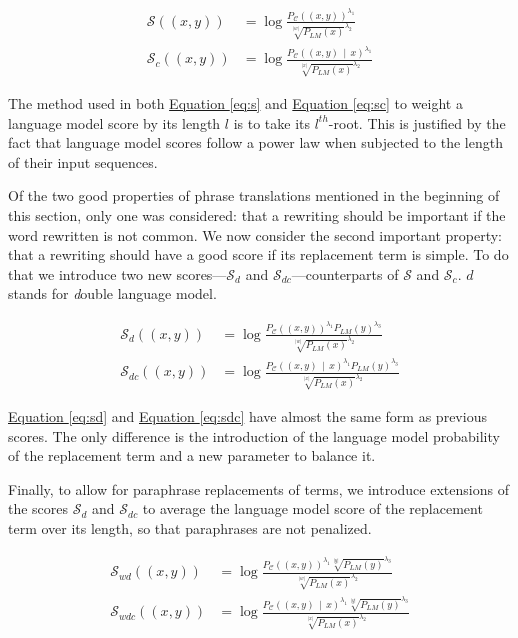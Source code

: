 \documentclass[a4paper, 11pt, onepage]{scrreprt}
\newcommand\equaref[1]{\hyperref[#1]{Equation \ref*{#1}}}
\newcommand\card[1]{\lvert #1 \rvert}
\newcommand\given{\, \middle| \,}
\newcommand\proba[2][]{P_{#1} \left( #2 \right)}
\begin{document}
\begin{align}
  \label{eq:s}
  \mathcal{S}((x, y)) & = \log \frac%
  {\proba[\mathcal{C}]{(x, y)}^{\lambda_1}}%
  {\sqrt[\card{w}]{\proba[LM]{x}}^{\lambda_2}} \\
  \label{eq:sc}
  \mathcal{S}_{c}((x, y)) & = \log \frac%
  {\proba[\mathcal{C}]{(x, y) \given x}^{\lambda_1}}%
  {\sqrt[\card{x}]{\proba[LM]{x}}^{\lambda_2}}
\end{align}

The method used in both \equaref{eq:s} and \equaref{eq:sc} to
weight a language model score by its length $l$ is to take its
$l^{th}$-root. This is justified by the fact that language model
scores follow a power law when subjected to the length of their input
sequences.

Of the two good properties of phrase translations mentioned in the
beginning of this section, only one was considered: that a rewriting
should be important if the word rewritten is not common. We now
consider the second important property: that a rewriting should have a
good score if its replacement term is simple. To do that we introduce
two new scores—$\mathcal{S}_d$ and $\mathcal{S}_{dc}$—counterparts of
$\mathcal{S}$ and $\mathcal{S}_c$. $d$ stands for \emph{d}ouble
language model.

\begin{align}
  \label{eq:sd}
  \mathcal{S}_d((x, y)) & = \log \frac%
  {\proba[\mathcal{C}]{(x, y)}^{\lambda_1}\proba[LM]{y}^{\lambda_3}}%
  {\sqrt[\card{w}]{\proba[LM]{x}}^{\lambda_2}} \\
  \label{eq:sdc}
  \mathcal{S}_{dc}((x, y)) & = \log \frac%
  {\proba[\mathcal{C}]{(x, y) \given x}^{\lambda_1}\proba[LM]{y}^{\lambda_3}}%
  {\sqrt[\card{x}]{\proba[LM]{x}}^{\lambda_2}}
\end{align}

\equaref{eq:sd} and \equaref{eq:sdc} have almost the same form as
previous scores. The only difference is the introduction of the
language model probability of the replacement term and a new parameter
to balance it.

Finally, to allow for paraphrase replacements of terms, we introduce
extensions of the scores $\mathcal{S}_d$ and $\mathcal{S}_{dc}$ to
average the language model score of the replacement term over its
length, so that paraphrases are not penalized.

\begin{align}
  \label{eq:swd}
  \mathcal{S}_{wd}((x, y)) & = \log \frac%
  {\proba[\mathcal{C}]{(x, y)}^{\lambda_1}\sqrt[\card{y}]{\proba[LM]{y}}^{\lambda_3}}%
  {\sqrt[\card{w}]{\proba[LM]{x}}^{\lambda_2}} \\
  \label{eq:swdc}
  \mathcal{S}_{wdc}((x, y)) & = \log \frac%
  {\proba[\mathcal{C}]{(x, y) \given x}^{\lambda_1}\sqrt[\card{y}]{\proba[LM]{y}}^{\lambda_3}}%
  {\sqrt[\card{x}]{\proba[LM]{x}}^{\lambda_2}}
\end{align}
\end{document}
